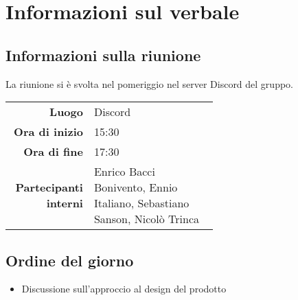 \section{Informazioni sul verbale}

\subsection{Informazioni sulla riunione}
La riunione si è svolta nel pomeriggio nel server Discord del gruppo.

\begin{center}
	\begin{tabular}{r|p{0.6\linewidth}}
		\toprule
		\textbf{Luogo} & Discord \\
		\textbf{Ora di inizio} & 15:30 \\
		\textbf{Ora di fine} & 17:30 \\
		\textbf{Partecipanti interni} & Enrico Bacci Bonivento, Ennio Italiano, Sebastiano Sanson, Nicolò Trinca
	\end{tabular}
\end{center}

\medskip

\subsection{Ordine del giorno}
\begin{itemize}
	\item Discussione sull'approccio al design del prodotto
\end{itemize}